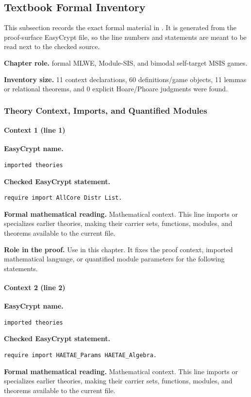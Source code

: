 \subsection*{Textbook Formal Inventory}
This subsection records the exact formal material in .  It is generated from the proof-surface EasyCrypt file, so the line numbers and statements are meant to be read next to the checked source.

\noindent\textbf{Chapter role.} formal MLWE, Module-SIS, and bimodal self-target MSIS games.

\noindent\textbf{Inventory size.} 11 context declarations, 60 definitions/game objects, 11 lemmas or relational theorems, and 0 explicit Hoare/Phoare judgments were found.

\subsubsection*{Theory Context, Imports, and Quantified Modules}
\paragraph{Context 1 (line 1)}
\noindent\textbf{EasyCrypt name.}
\begin{lstlisting}[language=EasyCrypt,basicstyle=\ttfamily\scriptsize]
imported theories
\end{lstlisting}
\noindent\textbf{Checked EasyCrypt statement.}
\begin{lstlisting}[language=EasyCrypt,basicstyle=\ttfamily\scriptsize]
require import AllCore Distr List.
\end{lstlisting}
\noindent\textbf{Formal mathematical reading.}
Mathematical context. This line imports or specializes earlier theories, making their carrier sets, functions, modules, and theorems available to the current file.

\noindent\textbf{Role in the proof.}
Use in this chapter. It fixes the proof context, imported mathematical language, or quantified module parameters for the following statements.

\paragraph{Context 2 (line 2)}
\noindent\textbf{EasyCrypt name.}
\begin{lstlisting}[language=EasyCrypt,basicstyle=\ttfamily\scriptsize]
imported theories
\end{lstlisting}
\noindent\textbf{Checked EasyCrypt statement.}
\begin{lstlisting}[language=EasyCrypt,basicstyle=\ttfamily\scriptsize]
require import HAETAE_Params HAETAE_Algebra.
\end{lstlisting}
\noindent\textbf{Formal mathematical reading.}
Mathematical context. This line imports or specializes earlier theories, making their carrier sets, functions, modules, and theorems available to the current file.

